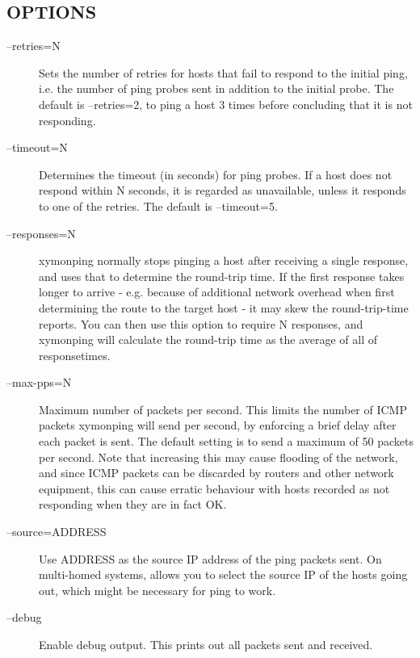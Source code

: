  
\subsection{OPTIONS}
\begin{description}
\item[--retries=N] Sets the number of retries for hosts that fail to
  respond to the initial ping, i.e. the number of ping probes sent in
  addition to the initial probe. The default is --retries=2, to ping a
  host 3 times before concluding that it is not responding. 


 

\item[--timeout=N] Determines the timeout (in seconds) for ping
  probes. If a host does not respond within N seconds, it is regarded
  as unavailable, unless it responds to one of the retries. The
  default is --timeout=5. 


 

\item[--responses=N] xymonping normally stops pinging a host after
  receiving a single response, and uses that to determine the
  round-trip time. If the first response takes longer to arrive -
  e.g. because of additional network overhead when first determining
  the route to the target host - it may skew the round-trip-time
  reports. You can then use this option to require N responses, and
  xymonping will calculate the round-trip time as the average of all
  of responsetimes. 


 

\item[--max-pps=N] Maximum number of packets per second. This limits
  the number of ICMP packets xymonping will send per second, by
  enforcing a brief delay after each packet is sent. The default
  setting is to send a maximum of 50 packets per second. Note that
  increasing this may cause flooding of the network, and since ICMP
  packets can be discarded by routers and other network equipment,
  this can cause erratic behaviour with hosts recorded as not
  responding when they are in fact OK. 


 

\item[--source=ADDRESS] Use ADDRESS as the source IP address of the
  ping packets sent. On multi-homed systems, allows you to select the
  source IP of the hosts going out, which might be necessary for ping
  to work. 


 

\item[--debug] Enable debug output. This prints out all packets sent and received. 



\end{description}

